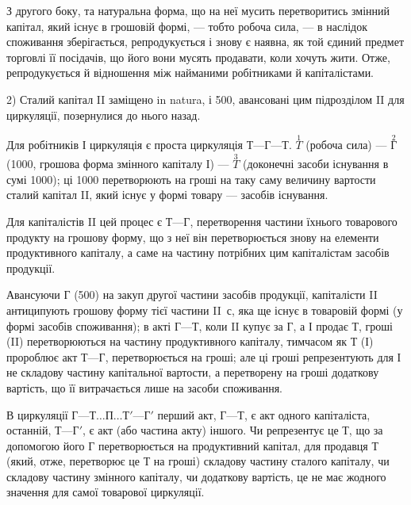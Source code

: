 
З другого боку, та натуральна форма, що на неї мусить перетворитись
змінний капітал, який існує в грошовій формі, — тобто робоча сила, —
в наслідок споживання зберігається, репродукується і знову є наявна,
як той єдиний предмет торговлі її посідачів, що його вони мусять продавати,
коли хочуть жити. Отже, репродукується й відношення між найманими
робітниками й капіталістами.

2) Сталий капітал II заміщено in natura, і 500, авансовані
цим підрозділом II для циркуляції, позернулися до нього назад.

Для робітників І циркуляція є проста циркуляція $Т — Г — Т$. $\overset{1}{T}$ (робоча
сила) — $\overset{2}{Г}$ (1000, грошова форма змінного капіталу І) — $\overset{3}{T}$
(доконечні засоби існування в сумі 1000); ці 1000
перетворюють на гроші на таку саму величину вартости сталий капітал II,
який існує у формі товару — засобів існування.

Для капіталістів II цей процес є $Т — Г$, перетворення частини їхнього
товарового продукту на грошову форму, що з неї він перетворюється
знову на елементи продуктивного капіталу, а саме на частину потрібних
цим капіталістам засобів продукції.

Авансуючи $Г$ (500) на закуп другої частини засобів продукції,
капіталісти II антиципують грошову форму тієї частини II~$с$, яка
ще існує в товаровій формі (у формі засобів споживання); в акті $Г — Т$,
коли II купує за $Г$, а І продає $Т$, гроші (II) перетворюються на частину
продуктивного капіталу, тимчасом як $Т$ (І) пророблює акт $Т — Г$, перетворюється
на гроші; але ці гроші репрезентують для І не складову частину
капітальної вартости, а перетворену на гроші додаткову вартість, що її
витрачається лише на засоби споживання.

В циркуляції $Г — Т\dots{} П\dots{} Т' — Г'$ перший акт, $Г — Т$, є акт одного капіталіста,
останній, $Т — Г'$, є акт (або частина акту) іншого. Чи репрезентує
це $Т$, що за допомогою його $Г$ перетворюється на продуктивний капітал,
для продавця $Т$ (який, отже, перетворює це $Т$ на гроші) складову частину
сталого капіталу, чи складову частину змінного капіталу, чи додаткову
вартість, це не має жодного значення для самої товарової циркуляції.

